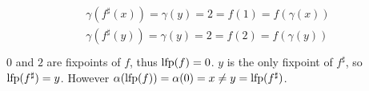 \begin{exercise}
\begin{enumerate}[1.]
\begin{gather*}
            \begin{aligned}
                \gamma(f^\sharp(x)) = \gamma(y) = 2 = f(1) = f(\gamma(x)) \\
                \gamma(f^\sharp(y)) = \gamma(y) = 2 = f(2) = f(\gamma(y)) \\
            \end{aligned}
        \end{gather*}
        $0$ and $2$ are fixpoints of $f$, thus $\operatorname{lfp}(f) = 0$. $y$ is the only fixpoint of $f^\sharp$, so $\operatorname{lfp}(f^\sharp) = y$. However $\alpha(\operatorname{lfp}(f)) = \alpha(0) = x \neq y = \operatorname{lfp}(f^\sharp)$.
    \end{enumerate}
\end{exercise}
